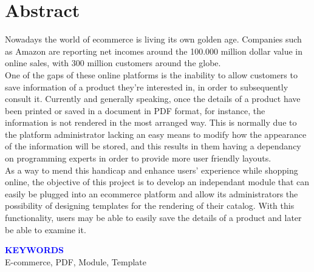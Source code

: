 \chapter{Abstract}

	Nowadays the world of ecommerce is living its own golden age. Companies such as Amazon are reporting net incomes around the 100.000 million dollar value in online sales, with 300 million customers around the globe.\\

	One of the gaps of these online platforms is the inability to allow customers to save information of a product they're interested in, in order to subsequently consult it. Currently and generally speaking, once the details of a product have been printed or saved in a document in PDF format, for instance, the information is not rendered in the most arranged way. This is normally due to the platform administrator lacking an easy means to modify how the appearance of the information will be stored, and this results in them having a dependancy on programming experts in order to provide more user friendly layouts.\\

	As a way to mend this handicap and enhance users' experience while shopping online, the objective of this project is to develop an independant module that can easily be plugged into an ecommerce platform and allow its administrators the possibility of designing templates for the rendering of their catalog. With this functionality, users may be able to easily save the details of a product and later be able to examine it.

\vspace{2cm}
{\textcolor{blue}{\large\bf KEYWORDS}}\\
E-commerce, PDF, Module, Template